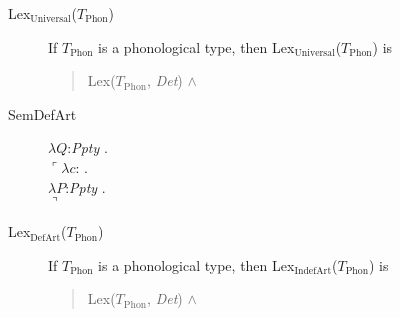 \begin{description}
 

  
\item[\textnormal{Lex$_{\mathrm{Universal}}$($T_{\mathrm{Phon}}$)}]
        \mbox{}

        If $T_{\mathrm{Phon}}$ is a phonological type, then
        Lex$_{\mathrm{Universal}}$($T_{\mathrm{Phon}}$) is
        \begin{quote}
          Lex($T_{\mathrm{Phon}}$, \textit{Det}) \d{$\wedge$}
        \end{quote}

        \item[\textnormal{SemDefArt}] \mbox{}


                    $\lambda Q$:\textit{Ppty} . \\
                    \hspace*{1em}$\ulcorner\lambda c$: . \\
  \hspace*{2em}$\lambda P$:\textit{Ppty} . \\
  \hspace*{3em}$\urcorner$


        
      \item[\textnormal{Lex$_{\mathrm{DefArt}}$($T_{\mathrm{Phon}}$)}]
        \mbox{}

        If $T_{\mathrm{Phon}}$ is a phonological type, then
        Lex$_{\mathrm{IndefArt}}$($T_{\mathrm{Phon}}$) is
        \begin{quote}
          Lex($T_{\mathrm{Phon}}$, \textit{Det}) \d{$\wedge$}
        \end{quote}


\end{description}

